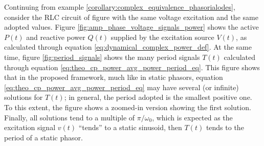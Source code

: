 \begin{example} \label{example:rlc_dpt_power} %

	Continuing from example \ref{corollary:complex_equivalence_phasorialodes}, consider the RLC circuit of figure with the same voltage excitation and the same adopted values. Figure \ref{fig:amp_phase_voltage_signals_power} shows the active $P(t)$ and reactive power $Q(t)$ supplied by the excitation source $V(t)$, as calculated through equation \eqref{eq:dynamical_complex_power_def}. At the same time, figure \ref{fig:period_signals} shows the many period signals $T(t)$ calculated through equation \eqref{eq:theo_cp_power_avg_power_period_eq}. This figure shows that in the proposed framework, much like in static phasors, equation \eqref{eq:theo_cp_power_avg_power_period_eq} may have several (or infinite) solutions for $T(t)$; in general, the period adopted is the smallest positive one. To this extent, the figure shows a zoomed-in version showing the first solution. Finally, all solutions tend to a multiple of $\pi/\omega_0$, which is expected as the excitation signal $v(t)$ ``tends'' to a static sinusoid, then $T(t)$ tends to the period of a static phasor.


\end{example}
